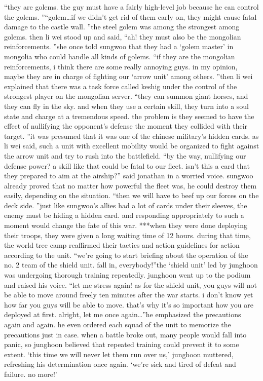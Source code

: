 “they are golems.
 the guy must have a fairly high-level job because he can control the golems.
”“golem…if we didn’t get rid of them early on, they might cause fatal damage to the castle wall.
”the steel golem was among the strongest among golems.
then li wei stood up and said, “ah! they must also be the mongolian reinforcements.
”she once told sungwoo that they had a ‘golem master’ in mongolia who could handle all kinds of golems.
“if they are the mongolian reinforcements, i think there are some really annoying guys.
 in my opinion, maybe they are in charge of fighting our ‘arrow unit’ among others.
”then li wei explained that there was a task force called keshig under the control of the strongest player on the mongolian server.
“they can summon giant horses, and they can fly in the sky.
 and when they use a certain skill, they turn into a soul state and charge at a tremendous speed.
 the problem is they seemed to have the effect of nullifying the opponent’s defense the moment they collided with their target.
”it was presumed that it was one of the chinese military’s hidden cards.
as li wei said, such a unit with excellent mobility would be organized to fight against the arrow unit and try to rush into the battlefield.
“by the way, nullifying our defense power? a skill like that could be fatal to our fleet.
 isn’t this a card that they prepared to aim at the airship?” said jonathan in a worried voice.
sungwoo already proved that no matter how powerful the fleet was, he could destroy them easily, depending on the situation.
“then we will have to beef up our forces on the deck side.
”just like sungwoo’s allies had a lot of cards under their sleeves, the enemy must be hiding a hidden card.
 and responding appropriately to such a moment would change the fate of this war.
***when they were done deploying their troops, they were given a long waiting time of 12 hours.
during that time, the world tree camp reaffirmed their tactics and action guidelines for action according to the unit.
“we’re going to start briefing about the operation of the no.
 2 team of the shield unit.
 fall in, everybody!”the ‘shield unit’ led by junghoon was undergoing thorough training repeatedly.
junghoon went up to the podium and raised his voice.
“let me stress again! as for the shield unit, you guys will not be able to move around freely ten minutes after the war starts.
 i don’t know yet how far you guys will be able to move.
 that’s why it’s so important how you are deployed at first.
 alright, let me once again…”he emphasized the precautions again and again.
 he even ordered each squad of the unit to memorize the precautions just in case.
when a battle broke out, many people would fall into panic, so junghoon believed that repeated training could prevent it to some extent.
‘this time we will never let them run over us,’ junghoon muttered, refreshing his determination once again.
 ‘we’re sick and tired of defeat and failure.
 no more!’

